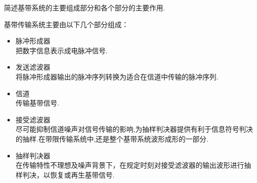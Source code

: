 简述基带系统的主要组成部分和各个部分的主要作用.

\begin{solution}
      基带传输系统主要由以下几个部分组成：
      \begin{itemize}
            \item 脉冲形成器\\
                  把数字信息表示成电脉冲信号.
            \item 发送滤波器\\
                  将脉冲形成器输出的脉冲序列转换为适合在信道中传输的脉冲序列.
            \item 信道\\
                  传输基带信号.
            \item 接受滤波器\\
                  尽可能抑制信道噪声对信号传输的影响,为抽样判决器提供有利于信息符号判决的抽样.在带限传输系统中,还是整个基带系统波形成形的一部分.
            \item 抽样判决器\\
                  在传输特性不理想及噪声背景下，在规定时刻对接受滤波器的输出波形进行抽样判决，以恢复或再生基带信号.
      \end{itemize}
\end{solution}

